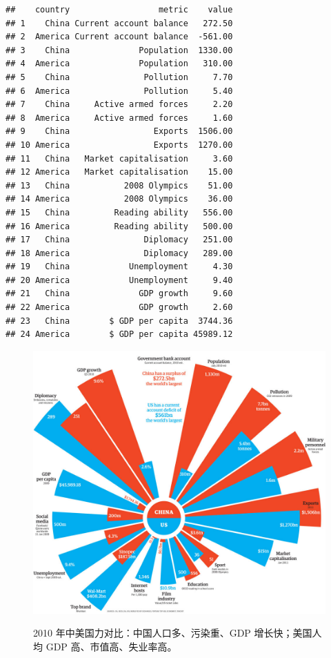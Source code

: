 \documentclass[
  b5paper,
  UTF8,twoside]{book}
\begin{document}
\begin{verbatim}
##    country                  metric    value
## 1    China Current account balance   272.50
## 2  America Current account balance  -561.00
## 3    China              Population  1330.00
## 4  America              Population   310.00
## 5    China               Pollution     7.70
## 6  America               Pollution     5.40
## 7    China     Active armed forces     2.20
## 8  America     Active armed forces     1.60
## 9    China                 Exports  1506.00
## 10 America                 Exports  1270.00
## 11   China   Market capitalisation     3.60
## 12 America   Market capitalisation    15.00
## 13   China           2008 Olympics    51.00
## 14 America           2008 Olympics    36.00
## 15   China         Reading ability   556.00
## 16 America         Reading ability   500.00
## 17   China               Diplomacy   251.00
## 18 America               Diplomacy   289.00
## 19   China            Unemployment     4.30
## 20 America            Unemployment     9.40
## 21   China              GDP growth     9.60
## 22 America              GDP growth     2.60
## 23   China        $ GDP per capita  3744.36
## 24 America        $ GDP per capita 45989.12
\end{verbatim}

\begin{figure}

{\centering \href{https://www.guardian.co.uk/news/datablog/2011/jan/19/china-social-media}{\includegraphics[width=0.7\linewidth]{images/China-v-US-graphic} }

}

\caption[2010 年中美国力对比扇形图 ]{2010 年中美国力对比：中国人口多、污染重、GDP 增长快；美国人均 GDP 高、市值高、失业率高。}\label{fig:cn-us-guardian}
\end{figure}
\end{document}
